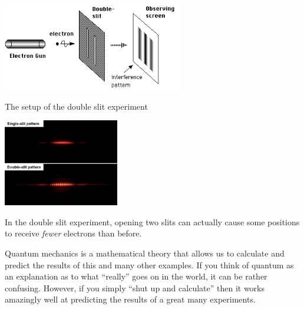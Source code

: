 \begin{marginfigure}
\centering
\includegraphics[width=\linewidth, height=1.5in, keepaspectratio]{../figure/double-slit-setup.PNG}
\caption{The setup of the double slit experiment}
\label{tmplabelfig}
\end{marginfigure}


\begin{marginfigure}
\centering
\includegraphics[width=\linewidth, height=1.5in, keepaspectratio]{../figure/double_slit2.jpg}
\caption{In the double slit experiment, opening two slits can actually
cause some positions to receive \emph{fewer} electrons than before.}
\label{tmplabelfig}
\end{marginfigure}

Quantum mechanics is a mathematical theory that allows us to calculate
and predict the results of this and many other examples. If you think of
quantum as an explanation as to what ``really'' goes on in the world, it
can be rather confusing. However, if you simply ``shut up and
calculate'' then it works amazingly well at predicting the results of a
great many experiments.


